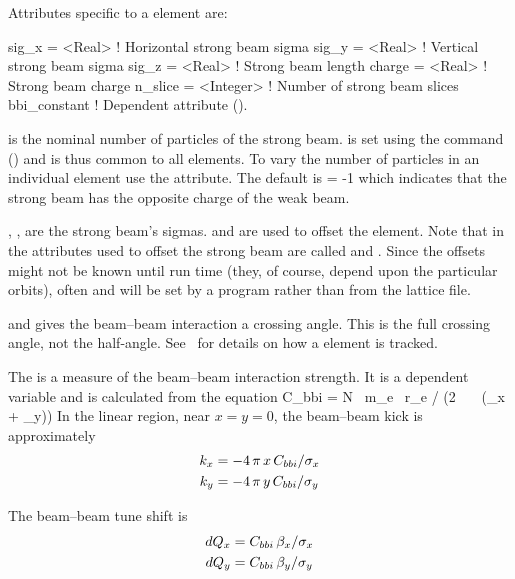 Attributes specific to a  element are:
\begin{example}
  sig_x   = <Real>     ! Horizontal strong beam sigma   
  sig_y   = <Real>     ! Vertical strong beam sigma
  sig_z   = <Real>     ! Strong beam length
  charge  = <Real>     ! Strong beam charge
  n_slice = <Integer>  ! Number of strong beam slices 
  bbi_constant         ! Dependent attribute ().
\end{example}

 is the nominal number of particles of the strong
beam.  is set using the  command
() and is thus common to all  elements.  To
vary the number of particles in an individual  element use the
 attribute. The default is  = -1 which indicates
that the strong beam has the opposite charge of the weak beam.

, ,  are the strong beam's sigmas. 
 and  are used to offset the
 element. Note that in \mad the attributes used to
offset the strong beam are called  and . Since the
offsets might not be known until run time (they, of course, depend
upon the particular orbits), often  and 
will be set by a program rather than from the lattice file.

 and  gives the beam--beam interaction a
crossing angle. This is the full crossing angle, not the half-angle.
See~ for details on how a  element is tracked.

The  is a measure of the beam--beam interaction
strength.  It is a dependent variable and is calculated from the
equation
\Begineq
  C_{bbi} = N \, m_e \, r_e / (2 \, \pi \, \gamma \, (\sigma_x + \sigma_y))
\Endeq
In the linear region, near $x = y = 0$, the 
beam--beam kick is approximately 
\begin{align}
  k_x &= -4\, \pi \, x \, C_{bbi} / \sigma_x \nonumber \\
  k_y &= -4\, \pi \, y \, C_{bbi} / \sigma_y 
\end{align}

The beam--beam tune shift is 
\begin{align}
  dQ_x &= C_{bbi} \, \beta_x / \sigma_x \nonumber \\
  dQ_y &= C_{bbi} \, \beta_y / \sigma_y \nonumber \\
\end{align}

